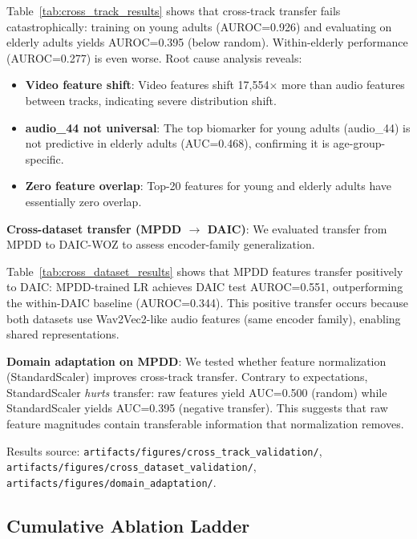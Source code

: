 \documentclass[12pt,oneside]{book}
\begin{document}
\begin{itemize}
Table~\ref{tab:cross_track_results} shows that cross-track transfer fails catastrophically: training on young adults (AUROC=0.926) and evaluating on elderly adults yields AUROC=0.395 (below random). Within-elderly performance (AUROC=0.277) is even worse. Root cause analysis reveals:
\begin{itemize}
    \item \textbf{Video feature shift}: Video features shift 17,554$\times$ more than audio features between tracks, indicating severe distribution shift.
    \item \textbf{audio\_44 not universal}: The top biomarker for young adults (audio\_44) is not predictive in elderly adults (AUC=0.468), confirming it is age-group-specific.
    \item \textbf{Zero feature overlap}: Top-20 features for young and elderly adults have essentially zero overlap.
\end{itemize}

\textbf{Cross-dataset transfer (MPDD $\rightarrow$ DAIC)}: We evaluated transfer from MPDD to DAIC-WOZ to assess encoder-family generalization.



Table~\ref{tab:cross_dataset_results} shows that MPDD features transfer positively to DAIC: MPDD-trained LR achieves DAIC test AUROC=0.551, outperforming the within-DAIC baseline (AUROC=0.344). This positive transfer occurs because both datasets use Wav2Vec2-like audio features (same encoder family), enabling shared representations.

\textbf{Domain adaptation on MPDD}: We tested whether feature normalization (StandardScaler) improves cross-track transfer. Contrary to expectations, StandardScaler \emph{hurts} transfer: raw features yield AUC=0.500 (random) while StandardScaler yields AUC=0.395 (negative transfer). This suggests that raw feature magnitudes contain transferable information that normalization removes.

Results source: \texttt{artifacts/figures/cross\_track\_validation/}, \texttt{artifacts/figures/cross\_dataset\_validation/}, \texttt{artifacts/figures/domain\_adaptation/}.



\subsection{Cumulative Ablation Ladder}
\label{sec:ablation_ladder}


\end{itemize}
\end{document}
